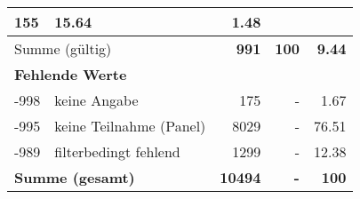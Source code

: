 \begin{longtable}{lXrrr}
       \num{155} &
       \num[round-mode=places,round-precision=2]{15.64} &
         \num[round-mode=places,round-precision=2]{1.48} \\
     \midrule
     \multicolumn{2}{l}{Summe (gültig)} &
       \textbf{\num{991}} &
     \textbf{\num{100}} &
       \textbf{\num[round-mode=places,round-precision=2]{9.44}} \\
     \multicolumn{5}{l}{\textbf{Fehlende Werte}}\\
       -998 &
       keine Angabe &
         \num{175} &
        - &
         \num[round-mode=places,round-precision=2]{1.67} \\
       -995 &
       keine Teilnahme (Panel) &
         \num{8029} &
        - &
         \num[round-mode=places,round-precision=2]{76.51} \\
       -989 &
       filterbedingt fehlend &
         \num{1299} &
        - &
         \num[round-mode=places,round-precision=2]{12.38} \\
     \midrule
     \multicolumn{2}{l}{\textbf{Summe (gesamt)}} &
          \textbf{\num{10494}} &
        \textbf{-} &
        \textbf{\num{100}} \\
     \bottomrule
     \end{longtable}
     
